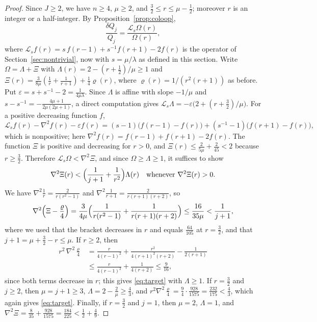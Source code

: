 \documentclass[11pt]{amsart}
\theoremstyle{definition}
\theoremstyle{remark}
\numberwithin{equation}{section}
\newcommand{\Ls}{\mathcal{L}_s}
\begin{document}
\begin{proof}
Since $J\ge2$, we have $n\ge4$, $\mu\ge2$, and $\frac32\le r\le\mu-\frac12$; moreover $r$ is an integer or a half-integer. By Proposition~\ref{prop:coloop},
\[
\frac{\delta Q_j}{Q_j}=\frac{\Ls\Omega(r)}{\Omega(r)},
\]
where $\Ls f(r)=s\,f(r-1)+s^{-1}f(r+1)-2f(r)$ is the operator of Section~\ref{sec:nontrivial}, now with $s=\mu/\lambda$ as defined in this section.
Write $\Omega=\Lambda+\Xi$ with $\Lambda(r)=2-(r+\frac12)/\mu\ge1$ and $\Xi(r)=\frac3{8\mu}(\frac1r+\frac1{r+1})+\frac14\varrho(r)$, where $\varrho(r)=1/(r^2(r+1))$ as before. Put $\varepsilon=s+s^{-1}-2=\frac{1}{4\mu\lambda}$. Since $\Lambda$ is affine with slope $-1/\mu$ and $s-s^{-1}=-\frac{4\mu+1}{2\mu(2\mu+1)}$, a direct computation gives $\Ls\Lambda=-\varepsilon\bigl(2+(r+\frac32)/\mu\bigr)$. For a positive decreasing function $f$,
\[
\Ls f(r)-\nabla^2f(r)-\varepsilon f(r)=(s-1)\bigl(f(r-1)-f(r)\bigr)+(s^{-1}-1)\bigl(f(r+1)-f(r)\bigr),
\]
which is nonpositive; here $\nabla^2f(r)=f(r-1)+f(r+1)-2f(r)$.
The function $\Xi$ is positive and decreasing for $r>0$, and $\Xi(r)\le\frac{2}{5\mu}+\frac2{45}<2$ because $r\ge\frac32$. Therefore $\Ls\Omega<\nabla^2\Xi$, and since $\Omega\ge\Lambda\ge1$, it suffices to show
\begin{equation}\label{eq:target}
\nabla^2\Xi(r)<\Bigl(\frac1{j+1}+\frac1{r^2}\Bigr)\Lambda(r)\quad\text{whenever }\nabla^2\Xi(r)>0.
\end{equation}
We have $\nabla^2\frac1r=\frac{2}{r(r^2-1)}$ and $\nabla^2\frac1{r+1}=\frac2{r(r+1)(r+2)}$, so
\[
\nabla^2\Bigl(\Xi-\frac\varrho4\Bigr)=\frac3{4\mu}\Bigl(\frac1{r(r^2-1)}+\frac1{r(r+1)(r+2)}\Bigr)\le\frac{16}{35\mu}<\frac1{j+1},
\]
where we used that the bracket decreases in $r$ and equals $\frac{64}{105}$ at $r=\frac32$, and that $j+1=\mu+\frac32-r\le\mu$. If $r\ge2$, then
\begin{align*}
r^2\,\nabla^2\frac\varrho4&=\frac r{4(r-1)^2}+\frac{r^2}{4(r+1)^2(r+2)}-\frac1{2(r+1)}\\
&\le\frac r{4(r-1)^2}+\frac1{4(r+2)}\le\frac9{16},
\end{align*}
since both terms decrease in $r$; this gives \eqref{eq:target} with $\Lambda\ge1$. If $r=\frac32$ and $j\ge2$, then $\mu=j+1\ge3$, $\Lambda=2-\frac2\mu\ge\frac43$, and $r^2\nabla^2\frac\varrho4=\frac94\cdot\frac{928}{1575}=\frac{232}{175}<\frac43$, which again gives \eqref{eq:target}. Finally, if $r=\frac32$ and $j=1$, then $\mu=2$, $\Lambda=1$, and $\nabla^2\Xi=\frac8{35}+\frac{928}{1575}=\frac{184}{225}<\frac12+\frac49$.
\end{proof}
\end{document}
